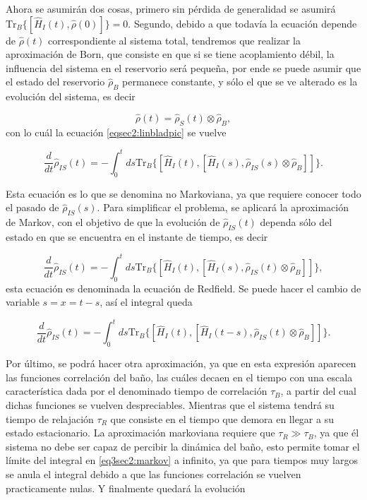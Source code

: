 Ahora se asumirán dos cosas, primero sin pérdida de generalidad se asumirá $\text{Tr}_{B}\{[\hat{H}_{I}(t),\hat{\rho}(0)] \} = 0$\cite{breuer2002theory}. Segundo, debido a que todavía la ecuación depende de $\hat{\rho}(t)$ correspondiente al sistema total, tendremos que realizar la aproximación de Born, que consiste en que si se tiene acoplamiento débil, la influencia del sistema en el reservorio será pequeña, por ende se puede asumir que el estado del reservorio $\hat{\rho}_{B}$ permanece constante, y sólo el que se ve alterado es la evolución del sistema, es decir

\begin{equation*}
    \hat{\rho}(t) = \hat{\rho}_{S}(t)\otimes \hat{\rho}_{B},
\end{equation*}
con lo cuál la ecuación \ref{eqsec2:linbladpic} se vuelve

\begin{equation}
    \frac{d}{dt}\hat{\rho}_{IS}(t) = -  \int_{0}^{t}ds \text{Tr}_{B}\{[\hat{H}_{I}(t), [\hat{H}_{I}(s),\hat{\rho}_{IS}(s) \otimes \hat{\rho}_{B}]]\}.
\end{equation} 

Esta ecuación es lo que se denomina no Markoviana, ya que requiere conocer todo el pasado de $\hat{\rho}_{IS}(s)$. Para simplificar el problema, se aplicará la aproximación de Markov, con el objetivo de que la evolución de $\hat{\rho}_{IS}(t)$ dependa sólo del estado en que se encuentra en el instante de tiempo, es decir

\begin{equation*}
    \frac{d}{dt}\hat{\rho}_{IS}(t) = -  \int_{0}^{t}ds \text{Tr}_{B}\{[\hat{H}_{I}(t), [\hat{H}_{I}(s),\hat{\rho}_{IS}(t) \otimes \hat{\rho}_{B}]]\},
\end{equation*} 
esta ecuación es denominada la ecuación de Redfield. Se puede hacer el cambio de variable $s= x = t-s$, así el integral queda

\begin{equation}
    \frac{d}{dt}\hat{\rho}_{IS}(t) = -  \int_{0}^{t}ds \text{Tr}_{B}\{[\hat{H}_{I}(t), [\hat{H}_{I}(t-s),\hat{\rho}_{IS}(t) \otimes \hat{\rho}_{B}]]\}.
    \label{eq3sec2:markov}
\end{equation} 

Por último, se podrá hacer otra aproximación, ya que en esta expresión aparecen las funciones correlación del baño, las cuáles decaen en el tiempo con una escala característica dada por el denominado tiempo de correlación $\tau_{B}$, a partir del cual dichas funciones se vuelven despreciables. Mientras que el sistema tendrá su tiempo de relajación $\tau_{R}$ que consiste en el tiempo que demora en llegar a su estado estacionario. La aproximación markoviana requiere que $\tau_{R}\gg \tau_{B}$, ya que él sistema no debe ser capaz de percibir la dinámica del baño, esto permite tomar el límite del integral en \ref{eq3sec2:markov} a infinito, ya que para tiempos muy largos se anula el integral debido a que las funciones correlación se vuelven practicamente nulas. Y finalmente quedará la evolución

